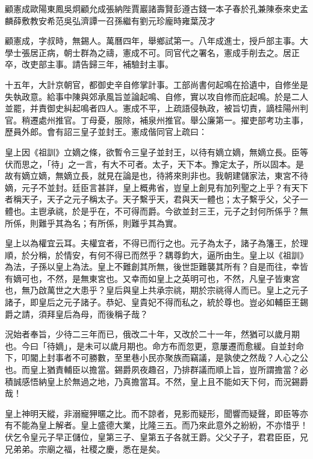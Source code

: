 
\begin{pinyinscope}
顧憲成歐陽東鳳吳炯顧允成張納陛賈巖諸壽賢彭遵古錢一本子春於孔兼陳泰來史孟麟薛敷教安希范吳弘濟譚一召孫繼有劉元珍龐時雍葉茂才

顧憲成，字叔時，無錫人。萬曆四年，舉鄉試第一。八年成進士，授戶部主事。大學士張居正病，朝士群為之禱，憲成不可。同官代之署名，憲成手削去之。居正卒，改吏部主事。請告歸三年，補驗封主事。

十五年，大計京朝官，都御史辛自修掌計事。工部尚書何起鳴在拾遺中，自修坐是失執政意。給事中陳與郊承風旨並論起鳴、自修，實以攻自修而庇起鳴。於是二人並罷，并責御史糾起鳴者四人。憲成不平，上疏語侵執政，被旨切責，謫桂陽州判官。稍遷處州推官。丁母憂，服除，補泉州推官。舉公廉第一。擢吏部考功主事，歷員外郎。會有詔三皇子並封王。憲成偕同官上疏曰：

皇上因《祖訓》立嫡之條，欲暫令三皇子並封王，以待有嫡立嫡，無嫡立長。臣等伏而思之，「待」之一言，有大不可者。太子，天下本。豫定太子，所以固本。是故有嫡立嫡，無嫡立長，就見在論是也，待將來則非也。我朝建儲家法，東宮不待嫡，元子不並封。廷臣言甚詳，皇上概弗省，豈皇上創見有加列聖之上乎？有天下者稱天子，天子之元子稱太子。天子繫乎天，君與天一體也；太子繫乎父，父子一體也。主鬯承祧，於是乎在，不可得而爵。今欲並封三王，元子之封何所係乎？無所係，則難乎其為名；有所係，則難乎其為實。

皇上以為權宜云耳。夫權宜者，不得已而行之也。元子為太子，諸子為籓王，於理順，於分稱，於情安，有何不得已而然乎？耦尊鈞大，逼所由生。皇上以《祖訓》為法，子孫以皇上為法。皇上不難創其所無，後世詎難襲其所有？自是而往，幸皆有嫡可也，不然，是無東宮也。又幸而如皇上之英明可也，不然，凡皇子皆東宮也，無乃啟萬世之大患乎？皇后與皇上共承宗祧，期於宗祧得人而已。皇上之元子諸子，即皇后之元子諸子。恭妃、皇貴妃不得而私之，統於尊也。豈必如輔臣王錫爵之請，須拜皇后為母，而後稱子哉？

況始者奉旨，少待二三年而已，俄改二十年，又改於二十一年，然猶可以歲月期也。今曰「待嫡」，是未可以歲月期也。命方布而忽更，意屢遷而愈緩。自並封命下，叩閽上封事者不可勝數，至里巷小民亦聚族而竊議，是孰使之然哉？人心之公也。而皇上猶責輔臣以擔當。錫爵夙夜趣召，乃排群議而順上旨，豈所謂擔當？必積誠感悟納皇上於無過之地，乃真擔當耳。不然，皇上且不能如天下何，而況錫爵哉！

皇上神明天縱，非溺寵狎暱之比。而不諒者，見影而疑形，聞響而疑聲，即臣等亦有不能為皇上解者。皇上盛德大業，比隆三五。而乃來此意外之紛紛，不亦惜乎！伏乞令皇元子早正儲位，皇第三子、皇第五子各就王爵。父父子子，君君臣臣，兄兄弟弟。宗廟之福，社稷之慶，悉在是矣。


\end{pinyinscope}
